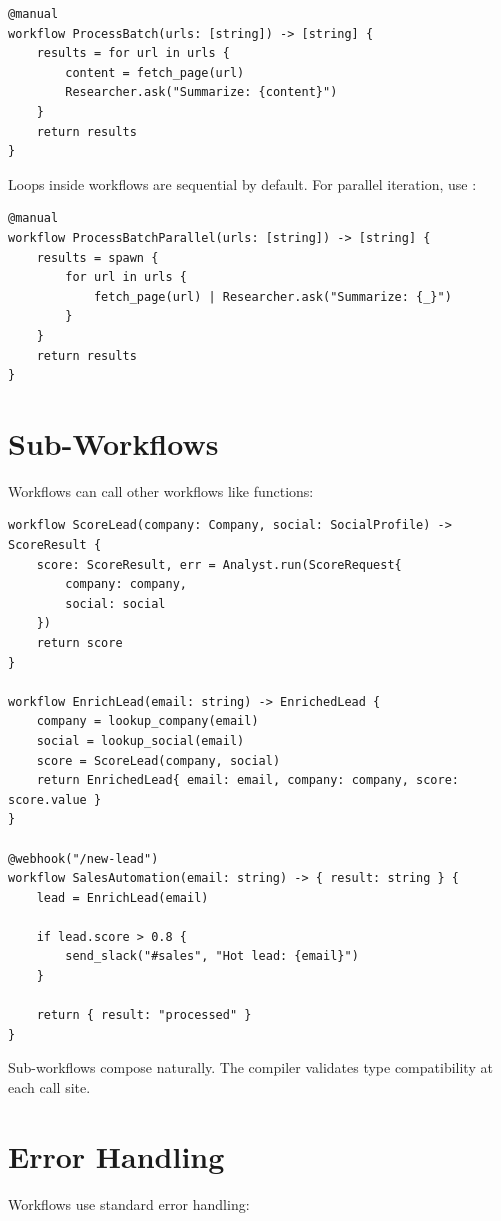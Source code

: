 \begin{lstlisting}
@manual
workflow ProcessBatch(urls: [string]) -> [string] {
    results = for url in urls {
        content = fetch_page(url)
        Researcher.ask("Summarize: {content}")
    }
    return results
}
\end{lstlisting}

Loops inside workflows are sequential by default. For parallel iteration, use :

\begin{lstlisting}
@manual
workflow ProcessBatchParallel(urls: [string]) -> [string] {
    results = spawn {
        for url in urls {
            fetch_page(url) | Researcher.ask("Summarize: {_}")
        }
    }
    return results
}
\end{lstlisting}

\section{Sub-Workflows}

Workflows can call other workflows like functions:

\begin{lstlisting}
workflow ScoreLead(company: Company, social: SocialProfile) -> ScoreResult {
    score: ScoreResult, err = Analyst.run(ScoreRequest{
        company: company,
        social: social
    })
    return score
}

workflow EnrichLead(email: string) -> EnrichedLead {
    company = lookup_company(email)
    social = lookup_social(email)
    score = ScoreLead(company, social)
    return EnrichedLead{ email: email, company: company, score: score.value }
}

@webhook("/new-lead")
workflow SalesAutomation(email: string) -> { result: string } {
    lead = EnrichLead(email)

    if lead.score > 0.8 {
        send_slack("#sales", "Hot lead: {email}")
    }

    return { result: "processed" }
}
\end{lstlisting}

Sub-workflows compose naturally. The compiler validates type compatibility at each call site.

\section{Error Handling}

Workflows use standard \haira{} error handling:

